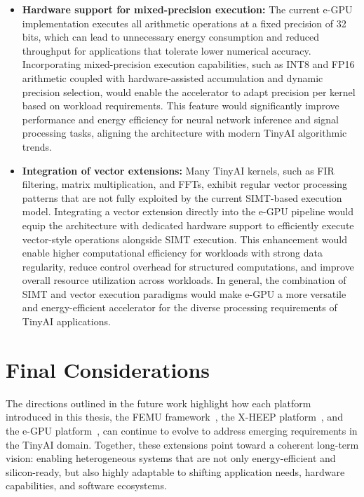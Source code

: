             \vspace{-1em}
            \begin{itemize}
                \item \textbf{Hardware support for mixed-precision execution:} The current \mbox{e-GPU} implementation executes all arithmetic operations at a fixed precision of 32 bits, which can lead to unnecessary energy consumption and reduced throughput for applications that tolerate lower numerical accuracy. Incorporating mixed-precision execution capabilities, such as INT8 and FP16 arithmetic coupled with hardware-assisted accumulation and dynamic precision selection, would enable the accelerator to adapt precision per kernel based on workload requirements. This feature would significantly improve performance and energy efficiency for neural network inference and signal processing tasks, aligning the architecture with modern TinyAI algorithmic trends.
            
                \item \textbf{Integration of vector extensions:} Many TinyAI kernels, such as FIR filtering, matrix multiplication, and FFTs, exhibit regular vector processing patterns that are not fully exploited by the current SIMT-based execution model. Integrating a vector extension directly into the \mbox{e-GPU} pipeline would equip the architecture with dedicated hardware support to efficiently execute vector-style operations alongside SIMT execution. This enhancement would enable higher computational efficiency for workloads with strong data regularity, reduce control overhead for structured computations, and improve overall resource utilization across workloads. In general, the combination of SIMT and vector execution paradigms would make \mbox{e-GPU} a more versatile and energy-efficient accelerator for the diverse processing requirements of TinyAI applications.
            \end{itemize}
            \vspace{-1em}
        
    \section{Final Considerations}
    
        The directions outlined in the future work highlight how each platform introduced in this thesis, the \mbox{FEMU} framework~\cite{femu}, the \mbox{X-HEEP} platform~\cite{x-heep}, and the \mbox{e-GPU} platform~\cite{e-gpu}, can continue to evolve to address emerging requirements in the TinyAI domain. Together, these extensions point toward a coherent long-term vision: enabling heterogeneous systems that are not only energy-efficient and silicon-ready, but also highly adaptable to shifting application needs, hardware capabilities, and software ecosystems.
        
